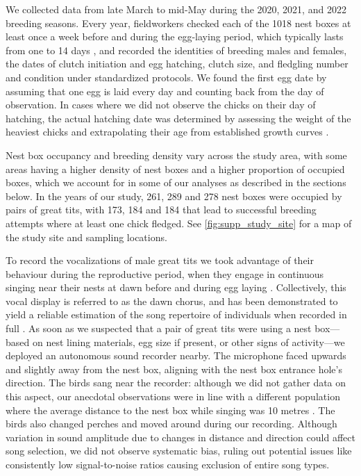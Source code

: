 We collected data from late March to mid-May during the 2020, 2021, and 2022 breeding seasons. Every year, fieldworkers checked each of the 1018 nest boxes at least once a week before and during the egg-laying period, which typically lasts from one to 14 days \autocite{Perrins1965}, and recorded the identities of breeding males and females, the dates of clutch initiation and egg hatching, clutch size, and fledgling number and condition under standardized protocols. We found the first egg date by assuming that one egg is laid every day and counting back from the day of observation. In cases where we did not observe the chicks on their day of hatching, the actual hatching date was determined by assessing the weight of the heaviest chicks and extrapolating their age from established growth curves \autocite{cresswell2003, gibb1950}.

Nest box occupancy and breeding density vary across the study area, with some areas having a higher density of nest boxes and a higher proportion of occupied boxes, which we account for in some of our analyses as described in the sections below. In the years of our study,  261, 289 and 278 nest boxes were occupied by pairs of great tits, with 173, 184 and 184 that lead to successful breeding attempts where at least one chick fledged. See \autoref{fig:supp_study_site} for a map of the study site and sampling locations.

To record the vocalizations of male great tits we took advantage of their behaviour during the reproductive period, when they engage in continuous singing near their nests at dawn before and during egg laying \autocite{mace1987}. Collectively, this vocal display is referred to as the dawn chorus, and has been demonstrated to yield a reliable estimation of the song repertoire of individuals when recorded in full \autocite{rivera-gutierrez2012, vanduyse2005}. As soon as we suspected that a pair of great tits were using a nest box---based on nest lining materials, egg size if present, or other signs of activity---we deployed an autonomous sound recorder nearby. The microphone faced upwards and slightly away from the nest box, aligning with the nest box entrance hole's direction. The birds sang near the recorder: although we did not gather data on this aspect, our anecdotal observations were in line with a different population where the average distance to the nest box while singing was 10 metres \autocite{halfwerk2012}. The birds also changed perches and moved around during our recording. Although variation in sound amplitude due to changes in distance and direction could affect song selection, we did not observe systematic bias, ruling out potential issues like consistently low signal-to-noise ratios causing exclusion of entire song types.

